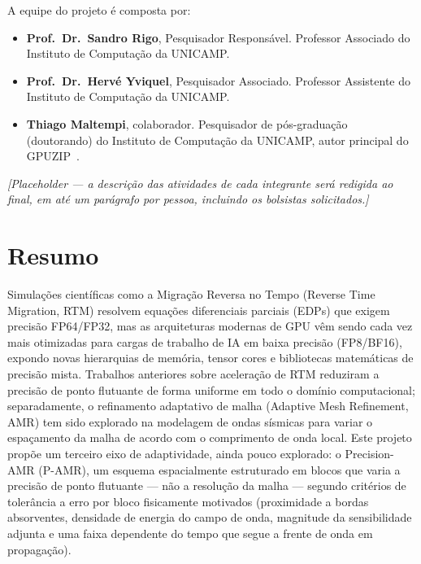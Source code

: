 \documentclass[12pt,a4paper]{article}
\newcommand{\pamr}{P\nobreakdash-AMR}
\begin{document}
A equipe do projeto é composta por:

\begin{itemize}
  \item \textbf{Prof.\ Dr.\ Sandro Rigo}, Pesquisador Responsável. Professor
        Associado do Instituto de Computação da UNICAMP.
  \item \textbf{Prof.\ Dr.\ Hervé Yviquel}, Pesquisador Associado. Professor
        Assistente do Instituto de Computação da UNICAMP.
  \item \textbf{Thiago Maltempi}, colaborador. Pesquisador de pós-graduação
        (doutorando) do Instituto de Computação da UNICAMP, autor principal
        do GPUZIP~\cite{maltempi2025checkpointing}.
\end{itemize}


\emph{[Placeholder --- a descrição das atividades de cada integrante será
redigida ao final, em até um parágrafo por pessoa, incluindo os bolsistas
solicitados.]}

\iffalse

\section*{Resumo}

Simulações científicas como a Migração Reversa no Tempo (Reverse Time
Migration, RTM) resolvem equações diferenciais parciais (EDPs) que exigem
precisão FP64/FP32, mas as arquiteturas modernas de GPU vêm sendo cada vez mais
otimizadas para cargas de trabalho de IA em baixa precisão (FP8/BF16),
expondo novas hierarquias de memória, tensor cores e bibliotecas matemáticas de
precisão mista. Trabalhos anteriores sobre aceleração de RTM reduziram a
precisão de ponto flutuante de forma uniforme em todo o domínio computacional;
separadamente, o refinamento adaptativo de malha (Adaptive Mesh Refinement,
AMR) tem sido explorado na modelagem de ondas sísmicas para variar o
espaçamento da malha de acordo com o comprimento de onda local. Este projeto
propõe um terceiro eixo de adaptividade, ainda pouco explorado: o
Precision-AMR (\pamr{}), um esquema espacialmente estruturado em blocos que
varia a precisão de ponto flutuante --- não a resolução da malha --- segundo
critérios de tolerância a erro por bloco fisicamente motivados (proximidade a
bordas absorventes, densidade de energia do campo de onda, magnitude da
sensibilidade adjunta e uma faixa dependente do tempo que segue a frente de
onda em propagação).
\end{document}
